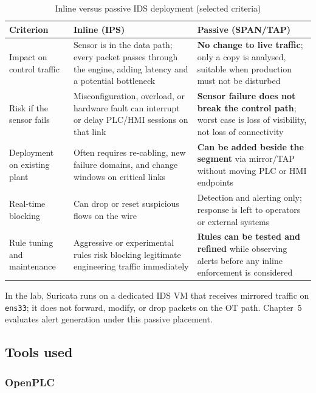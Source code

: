 ﻿\documentclass[../main.tex]{subfiles}
\begin{document}
\begin{table}[H]
    \centering
    \caption{Inline versus passive IDS deployment (selected criteria)}
    \label{tab:ids-inline-vs-passive}
    \begin{tabular}{|p{3.1cm}|p{4.9cm}|p{4.9cm}|}
        \hline
        \textbf{Criterion} & \textbf{Inline (IPS)} & \textbf{Passive (SPAN/TAP)} \\
        \hline
        Impact on control traffic &
        Sensor is in the data path; every packet passes through the engine, adding latency and a potential bottleneck &
        \textbf{No change to live traffic}; only a copy is analysed, suitable when production must not be disturbed \\
        \hline
        Risk if the sensor fails &
        Misconfiguration, overload, or hardware fault can interrupt or delay PLC/HMI sessions on that link &
        \textbf{Sensor failure does not break the control path}; worst case is loss of visibility, not loss of connectivity \\
        \hline
        Deployment on existing plant &
        Often requires re-cabling, new failure domains, and change windows on critical links &
        \textbf{Can be added beside the segment} via mirror/TAP without moving PLC or HMI endpoints \\
        \hline
        Real-time blocking &
        Can drop or reset suspicious flows on the wire &
        Detection and alerting only; response is left to operators or external systems \\
        \hline
        Rule tuning and maintenance &
        Aggressive or experimental rules risk blocking legitimate engineering traffic immediately &
        \textbf{Rules can be tested and refined} while observing alerts before any inline enforcement is considered \\
        \hline
    \end{tabular}
\end{table}

In the lab, Suricata runs on a dedicated IDS VM that receives mirrored traffic on \texttt{ens33}; it does not forward, modify, or drop packets on the OT path. Chapter~5 evaluates alert generation under this passive placement.

\subsection{Tools used}

\subsubsection{OpenPLC}
\end{document}

